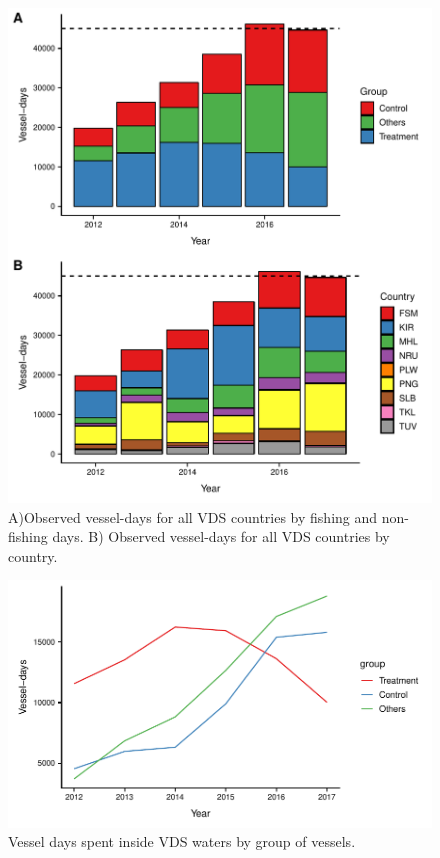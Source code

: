 \documentclass[9pt,twoside,lineno]{pnas-new}
\begin{document}
\begin{figure}
\centering
	\includegraphics{img/all_PS_VDS_cty_year.pdf}
	\caption{\label{fig:VDS_country_year}A)Observed vessel-days for all VDS countries by fishing and non-fishing days. B) Observed vessel-days for all VDS countries by country.}
\end{figure}

\begin{figure}
\centering
	\includegraphics{img/included_PS_VDS_year_DiD.pdf}
	\caption{\label{fig:included_PS_VDS_year_DiD}Vessel days spent inside VDS waters by group of vessels.}
\end{figure}
\end{document}
